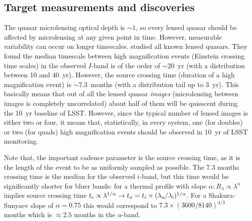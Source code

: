 
\subsection{Target measurements and discoveries}
\label{sec:\secname:targets}





The quasar microlensing optical depth is $\sim1$, so every lensed
quasar should be affected by microlensing at any given point in time.
However, measurable variability can occur on longer timescales.
\citet{MosqueraandKochanek2011} studied all known lensed quasars.
They found the median timescale between high magnification events
(Einstein crossing time scales) in the observed $I$-band is of the
order of $\sim20$~yr (with a distribution between 10 and 40~yr).
However, the source crossing time (duration of a high magnification
event) is $\sim7.3$~months (with a distribution tail up to 3~yr).
This basically means that out of all the lensed quasar {\em images}
(microlensing between images is completely uncorrelated) about half
of them will be quiescent during the 10~yr baseline of LSST. However,
since the typical number of lensed images is either two or four, it
means that, statistically, in every system, one (for doubles) or two
(for quads) high magnification events should be observed in 10~yr of
LSST monitoring.

Note that, the important cadence parameter is the source crossing time,
as it is the length of the event to be as uniformly sampled as
possible. The 7.3 months crossing time is the median for the observed
$i$-band, but this time would be significantly shorter for bluer bands:
for a thermal profile with slope
$\alpha: R_\lambda \propto \lambda^\alpha$ implies source crossing time
$t_{\rm s} \propto \lambda^{1/\alpha} \rightarrow
t_u=t_i \times (\lambda_{\rm u} / \lambda_{\rm i})^{1/\alpha}$. For a
Shakura-Sunyaev slope of $\alpha=0.75$ this would correspond to
$7.3 \times (3600/8140)^{4/3}$ months which is $\approx 2.5$ months in
the $u$-band.

